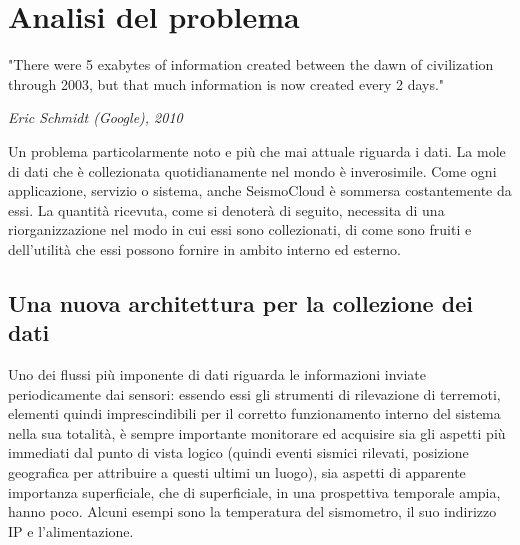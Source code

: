 \chapter{Analisi del problema}

\epigraph{"There were 5 exabytes of information created between the dawn of civilization through 2003, but that much information is now created every 2 days."}{\textit{Eric Schmidt (Google), 2010}}

\begin{flushleft}
\end{flushleft}
Un problema particolarmente noto e più che mai attuale riguarda i dati. La mole di dati che è collezionata quotidianamente nel mondo è inverosimile. Come ogni applicazione, servizio o sistema, anche SeismoCloud è sommersa costantemente da essi. La quantità ricevuta, come si denoterà di seguito, necessita di una riorganizzazione nel modo in cui essi sono collezionati, di come sono fruiti e dell'utilità che essi possono fornire in ambito interno ed esterno.

\section{Una nuova architettura per la collezione dei dati} \label{previousarch}

Uno dei flussi più imponente di dati riguarda le informazioni inviate periodicamente dai sensori: essendo essi gli strumenti di rilevazione di terremoti, elementi quindi imprescindibili per il corretto funzionamento interno del sistema nella sua totalità, è sempre importante monitorare ed acquisire sia gli aspetti più immediati dal punto di vista logico (quindi eventi sismici rilevati, posizione geografica per attribuire a questi ultimi un luogo), sia aspetti di apparente importanza superficiale, che di superficiale, in una prospettiva temporale ampia, hanno poco. Alcuni esempi sono la temperatura del sismometro, il suo indirizzo IP e l'alimentazione.

